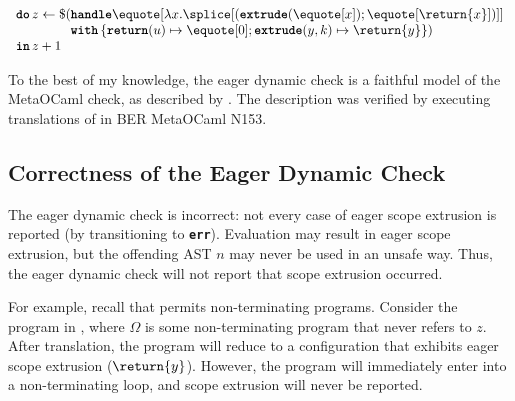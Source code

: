 \begin{code} 
 \begin{source}
  $\begin{array}{l}
      \textbf{\texttt{do}} \, z \leftarrow \$(\textbf{\texttt{handle}} \equote[{\lambda x. \splice[({{\textbf{\texttt{extrude}}(\equote[x])}; \equote[\return{x}]})]}] \\
      \quad\quad\quad\quad\,\textbf{\texttt{with}} \, \{ \textbf{\texttt{return}}(u) \mapsto {\equote[0]}; \textbf{\texttt{extrude}}(y, k) \mapsto {\return{y}}\})\\
      \textbf{\texttt{in}} \, z + 1
    \end{array}$
 \end{source}
 \label{listing:eager-scope-extrusion-check-eg-tls}
\end{code}

To the best of my knowledge, the eager dynamic check is a faithful model of the MetaOCaml check, as described by \citet{kiselyov-24}. The description was verified by executing translations of  in BER MetaOCaml N153. 

\subsection{Correctness of the Eager Dynamic Check}\label{subsection:eager-dynamic-correctness}
The eager dynamic check is incorrect: not every case of eager scope extrusion is reported (by transitioning to \textbf{\texttt{err}}). Evaluation may result in eager scope extrusion, but the offending AST $n$ may never be used in an unsafe way. Thus, the eager dynamic check will not report that scope extrusion occurred. 

For example, recall that \sourceLang{} permits non-terminating programs. Consider the \sourceLang{} program in , where $\Omega$ is some non-terminating program that never refers to $z$. After translation, the program will reduce to a configuration that exhibits eager scope extrusion ($\return{y}$). However, the program will immediately enter into a non-terminating loop, and scope extrusion will never be reported.

